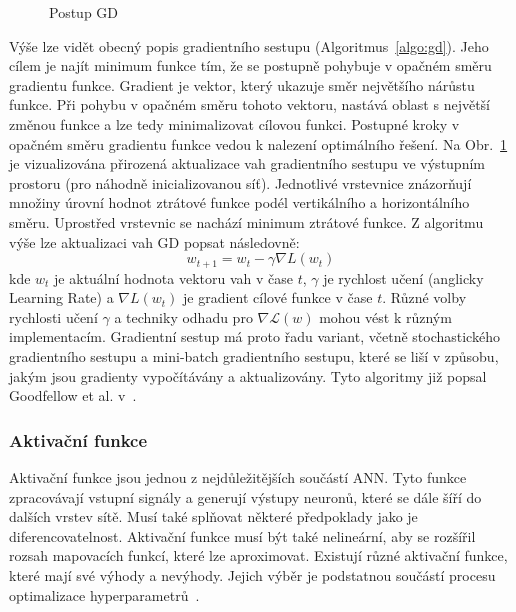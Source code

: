 \begin{figure}[h]
\begin{minipage}{0.4\textwidth}
        \caption{Postup \gls{GD}~\cite{gradientdescent}}
        \label{fig:gd}
    \end{minipage}
\end{figure}

Výše lze vidět obecný popis gradientního sestupu (Algoritmus~\ref{algo:gd}).
Jeho cílem je najít minimum funkce tím, že se postupně pohybuje v opačném směru
gradientu funkce. Gradient je vektor, který ukazuje směr největšího nárůstu
funkce. Při pohybu v opačném směru tohoto vektoru, nastává oblast s největší
změnou funkce a lze tedy minimalizovat cílovou funkci. Postupné kroky v opačném
směru gradientu funkce vedou k nalezení optimálního řešení. Na Obr.~\ref{fig:gd}
je vizualizována přirozená aktualizace vah gradientního sestupu ve výstupním
prostoru (pro náhodně inicializovanou síť). Jednotlivé vrstevnice znázorňují
množiny úrovní hodnot ztrátové funkce podél vertikálního a horizontálního směru.
Uprostřed vrstevnic se nachází minimum ztrátové funkce. Z algoritmu výše lze
aktualizaci vah GD popsat následovně:
\begin{equation}
    w_{t+1} = w_t - \gamma \nabla L(w_t)
\end{equation}
kde $w_t$ je aktuální hodnota vektoru vah v čase $t$, $\gamma$ je rychlost učení
(anglicky Learning Rate) a $\nabla L(w_t)$ je gradient cílové funkce v čase $t$.
Různé volby rychlosti učení $\gamma$ a techniky odhadu pro
$\nabla\mathcal{L}(w)$ mohou vést k různým implementacím. Gradientní sestup má
proto řadu variant, včetně stochastického gradientního sestupu a mini-batch
gradientního sestupu, které se liší v způsobu, jakým jsou gradienty vypočítávány
a aktualizovány. Tyto algoritmy již popsal Goodfellow et al.
v~\cite{Goodfellow2016}.

\subsubsection{Aktivační funkce}
Aktivační funkce jsou jednou z nejdůležitějších součástí \gls{ANN}. Tyto funkce
zpracovávají vstupní signály a generují výstupy neuronů, které se dále šíří do
dalších vrstev sítě. Musí také splňovat některé předpoklady jako je
diferencovatelnost. Aktivační funkce musí být také nelineární, aby se rozšířil
rozsah mapovacích funkcí, které lze aproximovat. Existují různé aktivační
funkce, které mají své výhody a nevýhody. Jejich výběr je podstatnou součástí
procesu optimalizace hyperparametrů~\cite{sharma2017,Goodfellow2016}.

